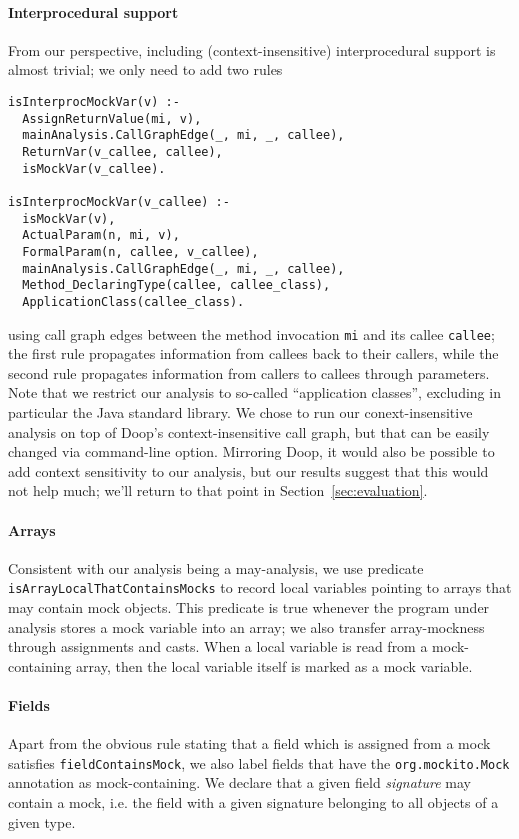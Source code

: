 \paragraph{Interprocedural support} From our perspective, including (context-insensitive) interprocedural support is almost trivial; we only need to add two rules
\begin{lstlisting}[basicstyle=\ttfamily\small,numbers=none]
isInterprocMockVar(v) :-
  AssignReturnValue(mi, v),
  mainAnalysis.CallGraphEdge(_, mi, _, callee),
  ReturnVar(v_callee, callee),
  isMockVar(v_callee).

isInterprocMockVar(v_callee) :-
  isMockVar(v),
  ActualParam(n, mi, v),
  FormalParam(n, callee, v_callee),
  mainAnalysis.CallGraphEdge(_, mi, _, callee),
  Method_DeclaringType(callee, callee_class),
  ApplicationClass(callee_class).
\end{lstlisting}
using call graph edges between the method invocation {\tt mi} and its callee {\tt callee}; the first rule propagates information from callees back to their callers, while the second rule propagates information from callers to callees through parameters. Note that we restrict our analysis to so-called ``application classes'', excluding in particular the Java standard library. We chose to run our conext-insensitive analysis on top of Doop's context-insensitive call graph, but that can be easily changed via command-line option. Mirroring Doop, it would also be possible to add context sensitivity to our analysis, but our results suggest that this would not help much; we'll return to that point in Section~\ref{sec:evaluation}.

\paragraph{Arrays} Consistent with our analysis being a may-analysis, we use predicate {\tt isArrayLocalThatContainsMocks} to record local variables pointing to arrays that may contain mock objects. This predicate is true whenever the program under analysis stores a mock variable into an array; we also transfer array-mockness through assignments and casts. When a local variable is read from a mock-containing array, then the local variable itself is marked as a mock variable.

\paragraph{Fields} Apart from the obvious rule stating that a field which is assigned from a mock satisfies {\tt fieldContainsMock}, we also label fields that have the {\tt org.mockito.Mock} annotation as mock-containing. We declare that a given field \emph{signature} may contain a mock, i.e. the field with a given signature belonging to all objects of a given type.

